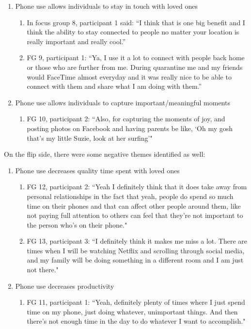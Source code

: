\documentclass[12pt, title page, manuscript, nonacm]{acmart}
\begin{document}
\begin{enumerate}
    \item Phone use allows individuals to stay in touch with loved ones\cite{elhai2017types}
    \begin{enumerate}
        \item In focus group 8, participant 1 said: “I think that is one big benefit and I think the ability to stay connected to people no matter your location is really important and really cool.”
        \item FG 9, participant 1: “Ya, I use it a lot to connect with people back home or those who are further from me. During quarantine me and my friends would FaceTime almost everyday and it was really nice to be able to connect with them and share what I am doing with them.”
    \end{enumerate}
    \item Phone use allows individuals to capture important/meaningful moments
    \begin{enumerate}
        \item FG 10, participant 2: “Also, for capturing the moments of joy, and posting photos on Facebook and having parents be like, ‘Oh my gosh that's my little Suzie, look at her surfing’"
    \end{enumerate}
\end{enumerate}
On the flip side, there were some negative themes identified as well:
\begin{enumerate}
    \item Phone use decreases quality time spent with loved ones\cite{dabbish2011keep}
    \begin{enumerate}
        \item FG 12, participant 2:  “Yeah I definitely think that it does take away from personal relationships in the fact that yeah, people do spend so much time on their phones and that can affect other people around them, like not paying full attention to others can feel that they’re not important to the person who’s on their phone."
        \item FG 13, participant 3: “I definitely think it makes me miss a lot. There are times when I will be watching Netflix and scrolling through social media, and my family will be doing something in a different room and I am just not there."\cite{tran2019modeling} 
    \end{enumerate}
    \item Phone use decreases productivity
    \begin{enumerate}
        \item FG 11, participant 1: “Yeah, definitely plenty of times where I just spend time on my phone, just doing whatever, unimportant things. And then there's not enough time in the day to do whatever I want to accomplish."
    \end{enumerate}
\end{enumerate}
\end{document}
